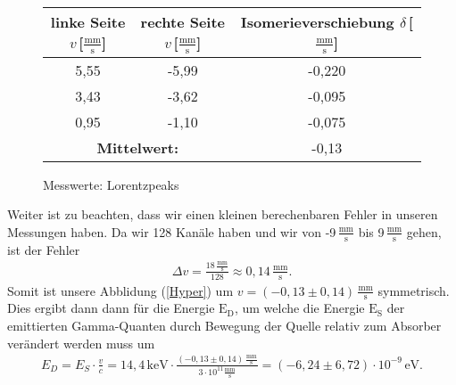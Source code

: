\documentclass[10pt,twoside]{article}
\renewcommand{\1}{^{-1}}
\renewcommand{\2}{^{-2}}
\newcommand{\3}{^{-3}}
\newcommand{\4}{^{-4}}
\newcommand{\5}{^{-5}}
\newcommand{\6}{^{-6}}
\newcommand{\7}{^{-7}}
\newcommand{\8}{^{-8}}
\newcommand{\9}{^{-9}}
\begin{document}
\begin{figure}[H]
\centering
\begin{tabular}{c|c||c}
\hline 
\rule[-1ex]{0pt}{2.5ex} linke Seite $v$\,[$\frac{\text{mm}}{\text{s}}$] & rechte Seite $v$\,[$\frac{\text{mm}}{\text{s}}$] & Isomerieverschiebung $\delta$\,[$\frac{\text{mm}}{\text{s}}$]  \\ 
\hline 
\rule[-1ex]{0pt}{2.5ex} 5,55 & -5,99 & -0,220 \\ 
\hline 
\rule[-1ex]{0pt}{2.5ex} 3,43 & -3,62 & -0,095 \\ 
\hline 
\rule[-1ex]{0pt}{2.5ex} 0,95 & -1,10 & -0,075 \\ 
\hline 
\hline 
\multicolumn{2}{c||}{\textbf{Mittelwert:}} & -0,13 \\ 
\hline 
\end{tabular} 
\caption{Messwerte: Lorentzpeaks}
\end{figure}
Weiter ist zu beachten, dass wir einen kleinen berechenbaren Fehler in unseren Messungen haben. Da wir 128 Kanäle haben und wir von -9\,$\frac{\text{mm}}{\text{s}}$ bis 9\,$\frac{\text{mm}}{\text{s}}$ gehen, ist der Fehler
\begin{align*}
\Delta v = \frac{18\,\frac{\text{mm}}{\text{s}}}{128} \approx0,14\,\frac{\text{mm}}{\text{s}}.
\end{align*}
Somit ist unsere Abblidung (\ref{Hyper}) um $v=(-0,13\pm0,14)\,\frac{\text{mm}}{\text{s}}$ symmetrisch. Dies ergibt dann dann für die Energie $\text{E}_{\text{D}}$, um welche
die Energie $\text{E}_{\text{S}}$
der emittierten Gamma-Quanten durch Bewegung
der Quelle relativ zum Absorber verändert
werden muss um
\begin{align*}
{E}_{{D}} = E_S\cdot\frac{v}{c} = 14,4\,\text{keV}\cdot\frac{(-0,13\pm0,14)\,\frac{\text{mm}}{\text{s}}}{3\cdot 10^{11} \frac{\text{mm}}{\text{s}} } = (-6,24\pm 6,72)\cdot 10^{-9}\,\text{eV}{.}
\end{align*} 
\end{document}
